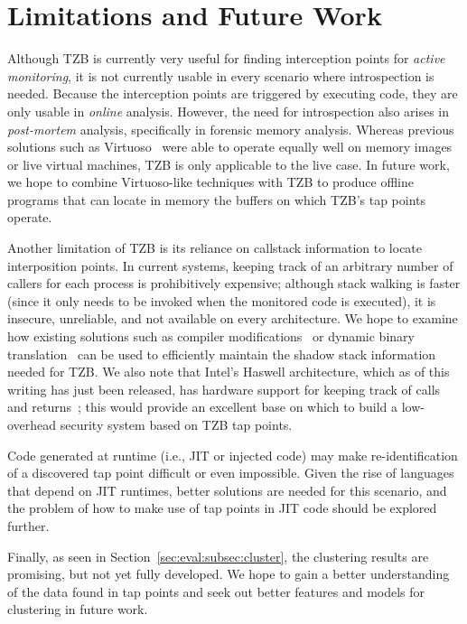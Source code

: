 \section{Limitations and Future Work}
\label{sec:limitations}

Although TZB is currently very useful for finding interception points
for \emph{active monitoring}, it is not currently usable in every
scenario where introspection is needed. Because the interception points
are triggered by executing code, they are only usable in \emph{online}
analysis. However, the need for introspection also arises in
\emph{post-mortem} analysis, specifically in forensic memory analysis.
Whereas previous solutions such as Virtuoso~\cite{Dolan-Gavitt:2011uq}
were able to operate equally well on memory images or live virtual
machines, TZB is only applicable to the live case. In future work, we
hope to combine Virtuoso-like techniques with TZB to produce offline
programs that can locate in memory the buffers on which TZB's tap points
operate.

Another limitation of TZB is its reliance on callstack information to
locate interposition points. In current systems, keeping track of an
arbitrary number of callers for each process is prohibitively expensive;
although stack walking is faster (since it only needs to be invoked when
the monitored code is executed), it is insecure, unreliable, and not
available on every architecture. We hope to examine how existing
solutions such as compiler modifications~\cite{stackshield,Chiueh:2001ys}
or dynamic binary translation~\cite{Sinnadurai:2008vn} can be used to
efficiently maintain the shadow stack information needed for TZB. We
also note that Intel's Haswell architecture, which as of this writing
has just been released, has hardware support for keeping track of calls
and returns~\cite{Haswell}; this would provide an excellent base on
which to build a low-overhead security system based on TZB tap points.

Code generated at runtime (i.e., JIT or injected code) may make
re-identification of a discovered tap point difficult or even
impossible. Given the rise of languages that depend on JIT runtimes,
better solutions are needed for this scenario, and the problem of how to
make use of tap points in JIT code should be explored further.

Finally, as seen in Section~\ref{sec:eval:subsec:cluster}, the
clustering results are promising, but not yet fully developed. We hope
to gain a better understanding of the data found in tap points and seek
out better features and models for clustering in future work.
